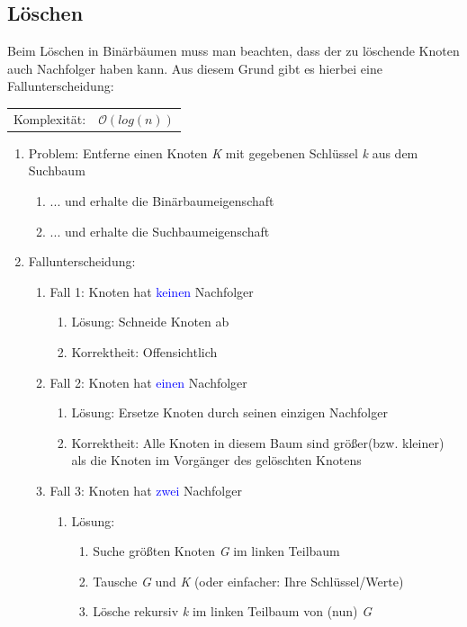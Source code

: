 \documentclass[12pt,a4paper]{article}
\begin{document}
\subsection{Löschen}
Beim Löschen in Binärbäumen muss man beachten, dass der zu löschende Knoten auch Nachfolger haben kann. Aus diesem Grund gibt es hierbei eine Fallunterscheidung:\newline \newline
\begin{tabularx}{\textwidth}{l l}
	Komplexität: &$\mathcal{O}(log(n))$\\
\end{tabularx}
\begin{enumerate}
	\item Problem: Entferne einen Knoten \textit{K} mit gegebenen Schlüssel \textit{k} aus dem Suchbaum
	\begin{enumerate}
		\item ... und erhalte die Binärbaumeigenschaft
		\item ... und erhalte die Suchbaumeigenschaft
	\end{enumerate}
	\item Fallunterscheidung:
	\begin{enumerate}
		\item Fall 1: Knoten hat \textcolor{blue}{keinen} Nachfolger
		\begin{enumerate}
			\item Lösung: Schneide Knoten ab
			\item Korrektheit: Offensichtlich
		\end{enumerate}
		\item Fall 2: Knoten hat \textcolor{blue}{einen} Nachfolger
		\begin{enumerate}
			\item Lösung: Ersetze Knoten durch seinen einzigen Nachfolger
			\item Korrektheit: Alle Knoten in diesem Baum sind größer(bzw. kleiner) als die Knoten im Vorgänger des gelöschten Knotens
		\end{enumerate}
		\item Fall 3: Knoten hat \textcolor{blue}{zwei} Nachfolger
		\begin{enumerate}
			\item Lösung: 
			\begin{enumerate}
				\item Suche größten Knoten \textit{G} im linken Teilbaum
				\item Tausche \textit{G} und \textit{K} (oder einfacher: Ihre Schlüssel/Werte)
				\item Lösche rekursiv \textit{k} im linken Teilbaum von (nun) \textit{G}
			\end{enumerate}
		\end{enumerate}
	\end{enumerate}
\end{enumerate}
\end{document}
